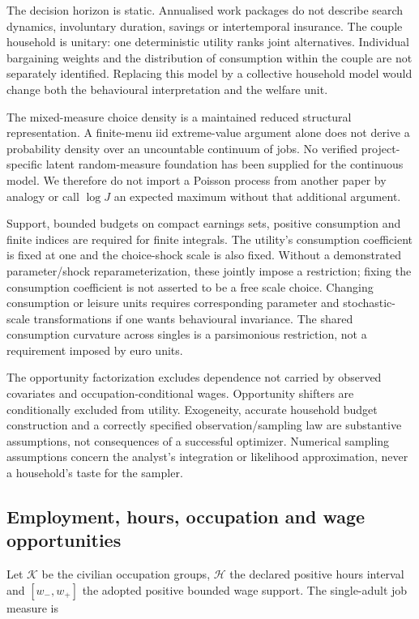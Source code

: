 \documentclass[11pt,a4paper]{article}
\begin{document}
The decision horizon is static. Annualised work packages do not describe search dynamics, involuntary duration, savings or intertemporal insurance. The couple household is unitary: one deterministic utility ranks joint alternatives. Individual bargaining weights and the distribution of consumption within the couple are not separately identified. Replacing this model by a collective household model would change both the behavioural interpretation and the welfare unit.

The mixed-measure choice density is a maintained reduced structural representation. A finite-menu iid extreme-value argument alone does not derive a probability density over an uncountable continuum of jobs. No verified project-specific latent random-measure foundation has been supplied for the continuous model. We therefore do not import a Poisson process from another paper by analogy or call \(\log J\) an expected maximum without that additional argument.

Support, bounded budgets on compact earnings sets, positive consumption and finite indices are required for finite integrals. The utility's consumption coefficient is fixed at one and the choice-shock scale is also fixed. Without a demonstrated parameter/shock reparameterization, these jointly impose a restriction; fixing the consumption coefficient is not asserted to be a free scale choice. Changing consumption or leisure units requires corresponding parameter and stochastic-scale transformations if one wants behavioural invariance. The shared consumption curvature across singles is a parsimonious restriction, not a requirement imposed by euro units.

The opportunity factorization excludes dependence not carried by observed covariates and occupation-conditional wages. Opportunity shifters are conditionally excluded from utility. Exogeneity, accurate household budget construction and a correctly specified observation/sampling law are substantive assumptions, not consequences of a successful optimizer. Numerical sampling assumptions concern the analyst's integration or likelihood approximation, never a household's taste for the sampler.

\subsection{Employment, hours, occupation and wage opportunities}\label{employment-hours-occupation-and-wage-opportunities}

Let \(\mathcal K\) be the civilian occupation groups, \(\mathcal H\) the declared positive hours interval and \([w_-,w_+]\) the adopted positive bounded wage support. The single-adult job measure is
\end{document}
